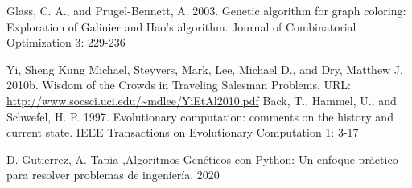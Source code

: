 \documentclass{article}
\begin{document}
\begin{thebibliography}{0}
    Glass, C. A., and Prugel-Bennett, A. 2003. Genetic algorithm for
    graph coloring: Exploration of Galinier and Hao's algorithm.
    Journal of Combinatorial Optimization 3: 229-236
    
    Yi, Sheng Kung Michael, Steyvers, Mark, Lee, Michael D., and
Dry, Matthew J. 2010b. Wisdom of the Crowds in Traveling
Salesman Problems. URL: \url{http://www.socsci.uci.edu/~mdlee/YiEtAl2010.pdf}
Back, T., Hammel, U., and Schwefel, H. P. 1997. Evolutionary
computation: comments on the history and current state. IEEE
Transactions on Evolutionary Computation 1: 3-17
    
    D. Gutierrez, A. Tapia ,Algoritmos Genéticos con Python: Un enfoque práctico para resolver problemas de ingeniería. 2020
    
    
\end{thebibliography}
\end{document}
